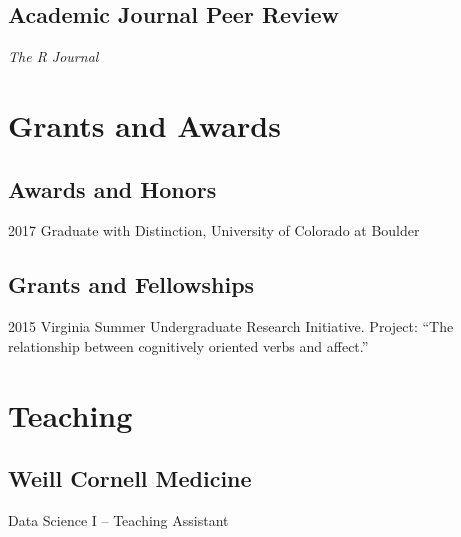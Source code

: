 \documentclass[12pt,letterpaper]{report}
\newcommand{\listitemspace}{0.15em}
\renewenvironment{itemize}
{\begin{list}{}{\setlength{\leftmargin}{0em}
            \setlength{\parskip}{0em}
            \setlength{\itemsep}{\listitemspace}
            \setlength{\parsep}{\listitemspace}}}
    {\end{list}}
\begin{document}
    \subsection*{Academic Journal Peer Review}
    
    \begin{itemize}
    
    	\item \textit{The R Journal}
    
    \end{itemize}

    \section*{Grants and Awards}

    \subsection*{Awards and Honors}

    \begin{tablist}

        \item[2017] \tab Graduate with Distinction, University of Colorado at Boulder

    \end{tablist}

    \subsection*{Grants and Fellowships}

    \begin{tablist}

        \item[2015] \tab Virginia Summer Undergraduate Research Initiative. Project: \enquote{The relationship between cognitively oriented verbs and affect.}

    \end{tablist}

    \section*{Teaching}
    
    \subsection*{Weill Cornell Medicine}
    
    \begin{itemize}
    
    	\item Data Science I -- Teaching Assistant
    
    \end{itemize}
\end{document}
